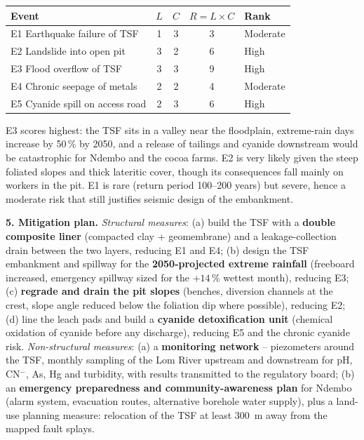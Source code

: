 \documentclass[11pt]{article}
\begin{document}
\begin{center}
\begin{tabular}{|l|c|c|c|l|}
\hline
\rowcolor{popblueL} \textbf{Event} & $L$ & $C$ & $R = L \times C$ & \textbf{Rank} \\
\hline
E1 Earthquake failure of TSF & 1 & 3 & 3 & Moderate \\
\hline
E2 Landslide into open pit & 3 & 2 & 6 & High \\
\hline
E3 Flood overflow of TSF & 3 & 3 & 9 & High \\
\hline
E4 Chronic seepage of metals & 2 & 2 & 4 & Moderate \\
\hline
E5 Cyanide spill on access road & 2 & 3 & 6 & High \\
\hline
\end{tabular}
\end{center}

E3 scores highest: the TSF sits in a valley near the floodplain, extreme-rain days increase by 50\,\% by 2050, and a release of tailings and cyanide downstream would be catastrophic for Ndembo and the cocoa farms. E2 is very likely given the steep foliated slopes and thick lateritic cover, though its consequences fall mainly on workers in the pit. E1 is rare (return period 100--200 years) but severe, hence a moderate risk that still justifies seismic design of the embankment.

\textbf{5. Mitigation plan.} \emph{Structural measures}: (a) build the TSF with a \textbf{double composite liner} (compacted clay + geomembrane) and a leakage-collection drain between the two layers, reducing E1 and E4; (b) design the TSF embankment and spillway for the \textbf{2050-projected extreme rainfall} (freeboard increased, emergency spillway sized for the $+14\,\%$ wettest month), reducing E3; (c) \textbf{regrade and drain the pit slopes} (benches, diversion channels at the crest, slope angle reduced below the foliation dip where possible), reducing E2; (d) line the leach pads and build a \textbf{cyanide detoxification unit} (chemical oxidation of cyanide before any discharge), reducing E5 and the chronic cyanide risk. \emph{Non-structural measures}: (a) a \textbf{monitoring network} -- piezometers around the TSF, monthly sampling of the Lom River upstream and downstream for pH, CN$^{-}$, As, Hg and turbidity, with results transmitted to the regulatory board; (b) an \textbf{emergency preparedness and community-awareness plan} for Ndembo (alarm system, evacuation routes, alternative borehole water supply), plus a land-use planning measure: relocation of the TSF at least 300~m away from the mapped fault splays.
\end{document}
